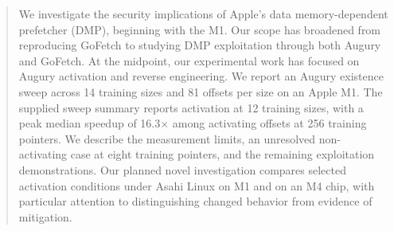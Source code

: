 \begin{abstract}
We investigate the security implications of Apple's data memory-dependent prefetcher (DMP), beginning with the M1. Our scope has broadened from reproducing GoFetch to studying DMP exploitation through both Augury and GoFetch. At the midpoint, our experimental work has focused on Augury activation and reverse engineering. We report an Augury existence sweep across 14 training sizes and 81 offsets per size on an Apple M1. The supplied sweep summary reports activation at 12 training sizes, with a peak median speedup of 16.3$\times$ among activating offsets at 256 training pointers. We describe the measurement limits, an unresolved non-activating case at eight training pointers, and the remaining exploitation demonstrations. Our planned novel investigation compares selected activation conditions under Asahi Linux on M1 and on an M4 chip, with particular attention to distinguishing changed behavior from evidence of mitigation.
\end{abstract}
